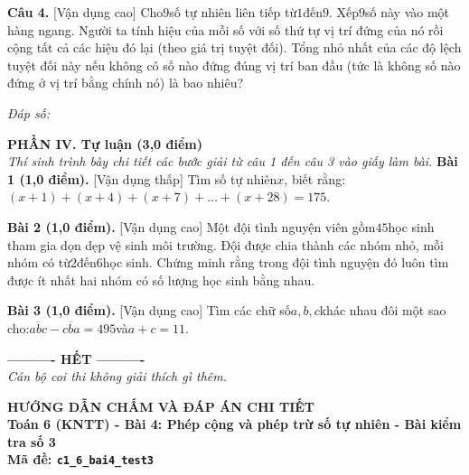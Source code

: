 \documentclass[11pt,a4paper]{article}
\begin{document}
\noindent\textbf{Câu 4.} [Vận dụng cao] Cho$9$số tự nhiên liên tiếp từ$1$đến$9$. Xếp$9$số này vào một hàng ngang. Người ta tính hiệu của mỗi số với số thứ tự vị trí đứng của nó rồi cộng tất cả các hiệu đó lại (theo giá trị tuyệt đối). Tổng nhỏ nhất của các độ lệch tuyệt đối này nếu không có số nào đứng đúng vị trí ban đầu (tức là không số nào đứng ở vị trí bằng chính nó) là bao nhiêu?\par\vspace{2pt}
\noindent\textit{Đáp số:} \dotfill\par\vspace{6pt}


\vspace{6pt}
\noindent
\textbf{\large PHẦN IV. Tự luận (3,0 điểm)}\\
\textit{\small Thí sinh trình bày chi tiết các bước giải từ câu 1 đến câu 3 vào giấy làm bài.}
\vspace{6pt}
\noindent\textbf{Bài 1 (1,0 điểm).} [Vận dụng thấp] Tìm số tự nhiên$x$, biết rằng:$(x + 1) + (x + 4) + (x + 7) + \dots + (x + 28) = 175$.\par\vspace{8pt}

\noindent\textbf{Bài 2 (1,0 điểm).} [Vận dụng cao] Một đội tình nguyện viên gồm$45$học sinh tham gia dọn dẹp vệ sinh môi trường. Đội được chia thành các nhóm nhỏ, mỗi nhóm có từ$2$đến$6$học sinh. Chứng minh rằng trong đội tình nguyện đó luôn tìm được ít nhất hai nhóm có số lượng học sinh bằng nhau.\par\vspace{8pt}

\noindent\textbf{Bài 3 (1,0 điểm).} [Vận dụng cao] Tìm các chữ số$a, b, c$khác nhau đôi một sao cho:$\overline{abc} - \overline{cba} = 495$và$a + c = 11$.\par\vspace{8pt}


\begin{center}
\textbf{---------- HẾT ----------}\\
\textit{\small Cán bộ coi thi không giải thích gì thêm.}
\end{center}

\newpage
\begin{center}
{\Large\bfseries HƯỚNG DẪN CHẤM VÀ ĐÁP ÁN CHI TIẾT}\\[4pt]
{\large\bfseries Toán 6 (KNTT) - Bài 4: Phép cộng và phép trừ số tự nhiên - Bài kiểm tra số 3}\\[2pt]
{\bfseries Mã đề: \texttt{c1\_6\_bai4\_test3}}
\end{center}
\end{document}
